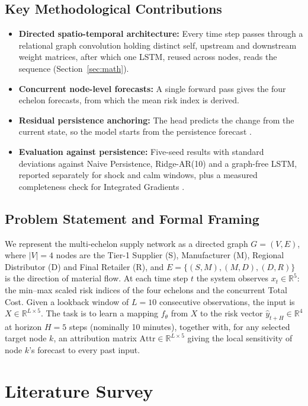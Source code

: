 \documentclass[conference]{IEEEtran}
\begin{document}
\subsection{Key Methodological Contributions}
\begin{itemize}
\item \textbf{Directed spatio-temporal architecture:} Every time step passes through a relational graph convolution holding distinct self, upstream and downstream weight matrices, after which one LSTM, reused across nodes, reads the sequence (Section~\ref{sec:math}).
\item \textbf{Concurrent node-level forecasts:} A single forward pass gives the four echelon forecasts, from which the mean risk index is derived.
\item \textbf{Residual persistence anchoring:} The head predicts the change from the current state, so the model starts from the persistence forecast \cite{r18}.
\item \textbf{Evaluation against persistence:} Five-seed results with standard deviations against Naive Persistence, Ridge-AR(10) and a graph-free LSTM, reported separately for shock and calm windows, plus a measured completeness check for Integrated Gradients \cite{r8}.
\end{itemize}

\subsection{Problem Statement and Formal Framing}
We represent the multi-echelon supply network as a directed graph $G=(V,E)$, where $|V|=4$ nodes are the Tier-1 Supplier (S), Manufacturer (M), Regional Distributor (D) and Final Retailer (R), and $E=\{(S,M),(M,D),(D,R)\}$ is the direction of material flow. At each time step $t$ the system observes $x_t\in\mathbb{R}^{5}$: the min--max scaled risk indices of the four echelons and the concurrent Total Cost. Given a lookback window of $L=10$ consecutive observations, the input is $X\in\mathbb{R}^{L\times5}$. The task is to learn a mapping $f_\theta$ from $X$ to the risk vector $\hat{y}_{t+H}\in\mathbb{R}^{4}$ at horizon $H=5$ steps (nominally 10 minutes), together with, for any selected target node $k$, an attribution matrix $\mathrm{Attr}\in\mathbb{R}^{L\times5}$ giving the local sensitivity of node $k$'s forecast to every past input.

\section{Literature Survey}
\end{document}
